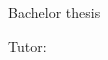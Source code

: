 \begin{titlepage}
    \begin{center}
        \vspace*{1cm}
        
        \Huge
        \textbf{\myTitle}
        
        \vspace{1cm}
        \LARGE
    
        \textbf{\myName \mySurname}
        
        \vfill
        
        Bachelor thesis
        
        \Large
    
        Tutor: \myTutor

        \vspace{1.8cm}
        
        \textbf{\myUniversity}\\
        \myDepartament\\
        \myLocation \currentYear
        
    \end{center}
    
\end{titlepage}